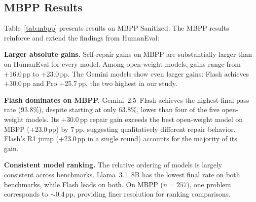 \documentclass[conference]{IEEEtran}
\begin{document}
\subsection{MBPP Results}

\begin{table}[t]
\centering
\caption{Cumulative pass@1 (\%) on MBPP Sanitized (257 problems) by repair round.}
\label{tab:mbpp}
\end{table}

Table~\ref{tab:mbpp} presents results on MBPP Sanitized. The MBPP results reinforce and extend the findings from HumanEval:

\textbf{Larger absolute gains.} Self-repair gains on MBPP are substantially larger than on HumanEval for every model. Among open-weight models, gains range from +16.0\,pp to +23.0\,pp. The Gemini models show even larger gains: Flash achieves +30.0\,pp and Pro +25.7\,pp, the two highest in our study.

\textbf{Flash dominates on MBPP.} Gemini~2.5~Flash achieves the highest final pass rate (93.8\%), despite starting at only 63.8\%, lower than four of the five open-weight models. Its +30.0\,pp repair gain exceeds the best open-weight model on MBPP (+23.0\,pp) by 7\,pp, suggesting qualitatively different repair behavior. Flash's R1 jump (+23.0\,pp in a single round) accounts for the majority of its gain.

\textbf{Consistent model ranking.} The relative ordering of models is largely consistent across benchmarks. Llama~3.1~8B has the lowest final rate on both benchmarks, while Flash leads on both. On MBPP ($n=257$), one problem corresponds to $\sim$0.4\,pp, providing finer resolution for ranking comparisons.
\end{document}
